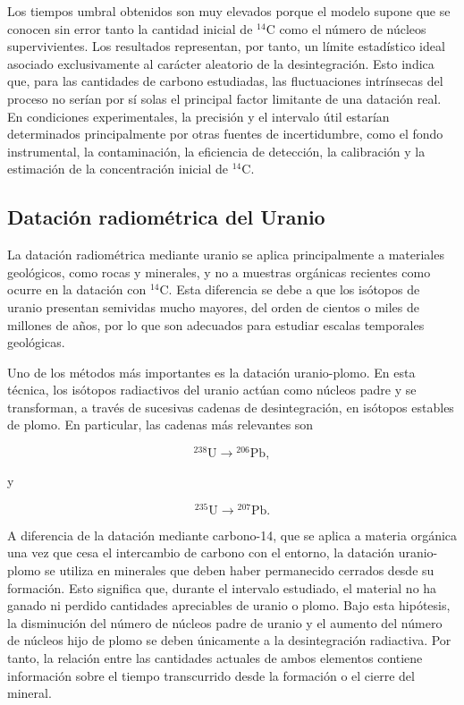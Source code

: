 \documentclass[12pt,a4paper]{article}
\begin{document}
Los tiempos umbral obtenidos son muy elevados porque el modelo supone que se conocen sin error tanto la cantidad inicial de $^{14}\text{C}$ como el número de núcleos supervivientes. Los resultados representan, por tanto, un límite estadístico ideal asociado exclusivamente al carácter aleatorio de la desintegración. Esto indica que, para las cantidades de carbono estudiadas, las fluctuaciones intrínsecas del proceso no serían por sí solas el principal factor limitante de una datación real. En condiciones experimentales, la precisión y el intervalo útil estarían determinados principalmente por otras fuentes de incertidumbre, como el fondo instrumental, la contaminación, la eficiencia de detección, la calibración y la estimación de la concentración inicial de $^{14}\text{C}$.

\subsection{Datación radiométrica del Uranio}

La datación radiométrica mediante uranio se aplica principalmente a materiales geológicos, como rocas y minerales, y no a muestras orgánicas recientes como ocurre en la datación con $^{14}\text{C}$. Esta diferencia se debe a que los isótopos de uranio presentan semividas mucho mayores, del orden de cientos o miles de millones de años, por lo que son adecuados para estudiar escalas temporales geológicas.


Uno de los métodos más importantes es la datación uranio-plomo. En esta técnica, los isótopos radiactivos del uranio actúan como núcleos padre y se transforman, a través de sucesivas cadenas de desintegración, en isótopos estables de plomo. En particular, las cadenas más relevantes son

\begin{equation}
{}^{238}\text{U} \longrightarrow {}^{206}\text{Pb},
\end{equation}

y

\begin{equation}
{}^{235}\text{U} \longrightarrow {}^{207}\text{Pb}.
\end{equation}

A diferencia de la datación mediante carbono-14, que se aplica a materia orgánica una vez que cesa el intercambio de carbono con el entorno, la datación uranio-plomo se utiliza en minerales que deben haber permanecido cerrados desde su formación. Esto significa que, durante el intervalo estudiado, el material no ha ganado ni perdido cantidades apreciables de uranio o plomo. Bajo esta hipótesis, la disminución del número de núcleos padre de uranio y el aumento del número de núcleos hijo de plomo se deben únicamente a la desintegración radiactiva. Por tanto, la relación entre las cantidades actuales de ambos elementos contiene información sobre el tiempo transcurrido desde la formación o el cierre del mineral.
\end{document}
